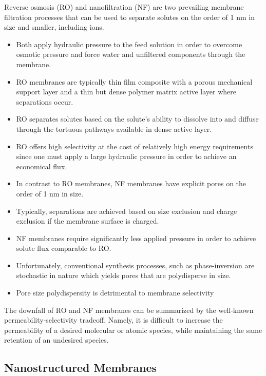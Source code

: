 \documentclass{article}
\begin{document}
  Reverse osmosis (RO) and nanofiltration (NF) are two prevailing membrane
  filtration processes that can be used to separate solutes on the order of
  1 nm in size and smaller, including ions.
  \begin{itemize}  
    \item Both apply hydraulic pressure to the feed solution in order to 
    overcome osmotic pressure and force water and unfiltered components 
    through the membrane.
    \item RO membranes are typically thin film composite with a porous mechanical 
    support layer and a thin but dense polymer matrix active layer where separations
    occur.\cite{jeong_interfacial_2007}
    \item RO separates solutes based on the solute's ability to dissolve into
    and diffuse through the tortuous pathways available in dense active layer.
    \item RO offers high selectivity at the cost of relatively high energy 
    requirements since one must apply a large hydraulic pressure in order to 
    achieve an economical flux.  %
    \item In contrast to RO membranes, NF membranes have explicit pores on the
    order of 1 nm in size. 
    \item Typically, separations are achieved based on size exclusion and
    charge exclusion if the membrane surface is charged.
    \item NF membranes require significantly less applied pressure in order
    to achieve solute flux comparable to RO.
    \item Unfortunately, conventional synthesis processes, such as 
    phase-inversion\cite{smolders_microstructures_1992} are stochastic in
    nature which yields pores that are polydisperse in size.\cite{werber_materials_2016} %
    \item Pore size polydispersity is detrimental to membrane selectivity
  \end{itemize}
  
  The downfall of RO and NF membranes can be summarized by the well-known
  permeability-selectivity tradeoff. Namely, it is difficult to increase the
  permeability of a desired molecular or atomic species, while maintaining
  the same retention of an undesired species.\cite{werber_materials_2016}  
  
  \subsection*{Nanostructured Membranes}
  
\end{document}
